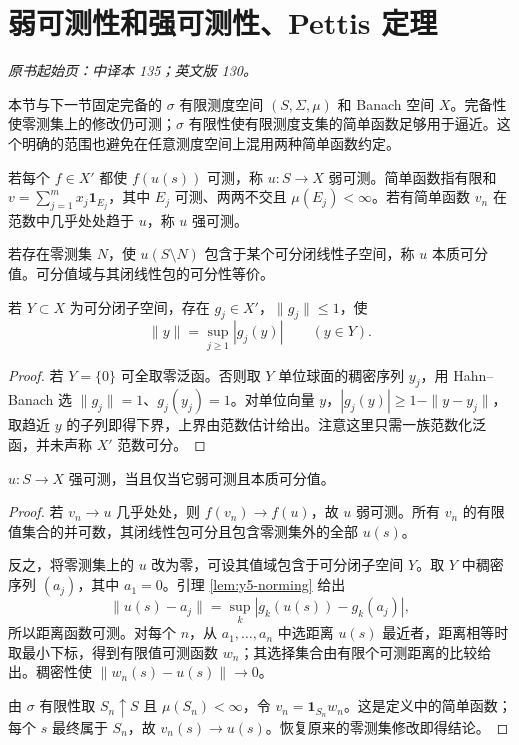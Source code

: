 \section{弱可测性和强可测性、Pettis 定理}\label{sec:yosida-05-04}
\noindent\textit{原书起始页：中译本 135；英文版 130。}

本节与下一节固定完备的 $\sigma$ 有限测度空间 $(S,\Sigma,\mu)$ 和 Banach 空间 $X$。完备性使零测集上的修改仍可测；$\sigma$ 有限性使有限测度支集的简单函数足够用于逼近。这个明确的范围也避免在任意测度空间上混用两种简单函数约定。

\begin{definition}[可测性与本质可分值域]
若每个 $f\in X'$ 都使 $f(u(s))$ 可测，称 $u:S\to X$ 弱可测。简单函数指有限和 $v=\sum_{j=1}^m x_j\mathbf1_{E_j}$，其中 $E_j$ 可测、两两不交且 $\mu(E_j)<\infty$。若有简单函数 $v_n$ 在范数中几乎处处趋于 $u$，称 $u$ 强可测。

若存在零测集 $N$，使 $u(S\setminus N)$ 包含于某个可分闭线性子空间，称 $u$ 本质可分值。可分值域与其闭线性包的可分性等价。
\end{definition}

\begin{lemma}[可分空间的可数范数化泛函]\label{lem:y5-norming}
若 $Y\subset X$ 为可分闭子空间，存在 $g_j\in X'$，$\|g_j\|\le1$，使
\[
 \|y\|=\sup_{j\ge1}|g_j(y)|\qquad(y\in Y).
\]
\end{lemma}
\begin{proof}
若 $Y=\{0\}$ 可全取零泛函。否则取 $Y$ 单位球面的稠密序列 $y_j$，用 Hahn--Banach 选 $\|g_j\|=1$、$g_j(y_j)=1$。对单位向量 $y$，$|g_j(y)|\ge1-\|y-y_j\|$，取趋近 $y$ 的子列即得下界，上界由范数估计给出。注意这里只需一族范数化泛函，并未声称 $X'$ 范数可分。
\end{proof}

\begin{theorem}\label{thm:y5-pettis}
$u:S\to X$ 强可测，当且仅当它弱可测且本质可分值。
\end{theorem}
\begin{proof}
若 $v_n\to u$ 几乎处处，则 $f(v_n)\to f(u)$，故 $u$ 弱可测。所有 $v_n$ 的有限值集合的并可数，其闭线性包可分且包含零测集外的全部 $u(s)$。

反之，将零测集上的 $u$ 改为零，可设其值域包含于可分闭子空间 $Y$。取 $Y$ 中稠密序列 $(a_j)$，其中 $a_1=0$。引理 \ref{lem:y5-norming} 给出
\[
 \|u(s)-a_j\|=\sup_k|g_k(u(s))-g_k(a_j)|,
\]
所以距离函数可测。对每个 $n$，从 $a_1,\ldots,a_n$ 中选距离 $u(s)$ 最近者，距离相等时取最小下标，得到有限值可测函数 $w_n$；其选择集合由有限个可测距离的比较给出。稠密性使 $\|w_n(s)-u(s)\|\to0$。

由 $\sigma$ 有限性取 $S_n\uparrow S$ 且 $\mu(S_n)<\infty$，令 $v_n=\mathbf1_{S_n}w_n$。这是定义中的简单函数；每个 $s$ 最终属于 $S_n$，故 $v_n(s)\to u(s)$。恢复原来的零测集修改即得结论。
\end{proof}

